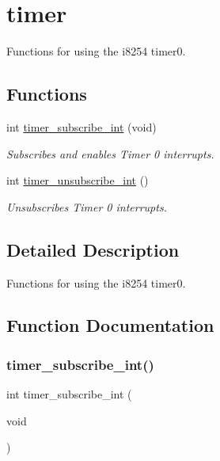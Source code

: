 \hypertarget{group__timer}{}\section{timer}
\label{group__timer}


Functions for using the i8254 timer0.  


\subsection*{Functions}
\begin{DoxyCompactItemize}
\item 
int \hyperlink{group__timer_ga4c5d9f47323eda494cfd826f6d62eec9}{timer\+\_\+subscribe\+\_\+int} (void)
\begin{DoxyCompactList}\small\item\em Subscribes and enables Timer 0 interrupts. \end{DoxyCompactList}\item 
int \hyperlink{group__timer_gab9eea51549744bca5c5c923b388bb4ee}{timer\+\_\+unsubscribe\+\_\+int} ()
\begin{DoxyCompactList}\small\item\em Unsubscribes Timer 0 interrupts. \end{DoxyCompactList}\end{DoxyCompactItemize}


\subsection{Detailed Description}
Functions for using the i8254 timer0. 



\subsection{Function Documentation}
\hypertarget{group__timer_ga4c5d9f47323eda494cfd826f6d62eec9}{}\label{group__timer_ga4c5d9f47323eda494cfd826f6d62eec9} 
\subsubsection{\texorpdfstring{timer\+\_\+subscribe\+\_\+int()}{timer\_subscribe\_int()}}
{\footnotesize\ttfamily int timer\+\_\+subscribe\+\_\+int (\begin{DoxyParamCaption}\item[{void}]{ }\end{DoxyParamCaption})}



